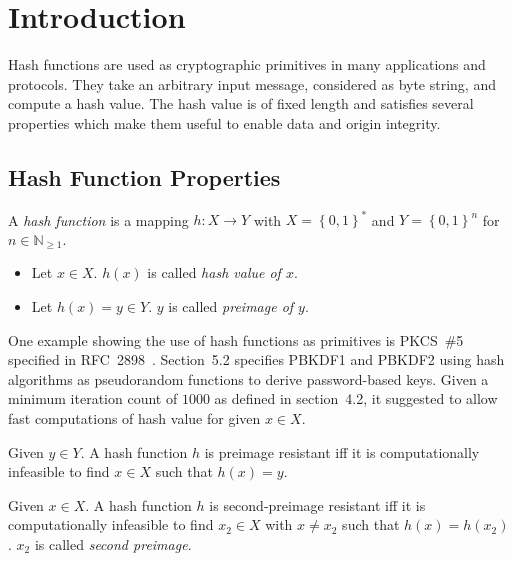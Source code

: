 \chapter{Introduction}
\label{ch:introduction}
%
Hash functions are used as cryptographic primitives in many applications and protocols.
They take an arbitrary input message, considered as byte string, and compute a hash value.
The hash value is of fixed length and satisfies several properties which make them useful
to enable data and origin integrity.

\section{Hash Function Properties}
\label{ch:hf-properties}
%
\begin{defi}
  A \emph{hash function} is a mapping $h: X \to Y$ with $X = \left\{0,1\right\}^*$ and
  $Y = \left\{0,1\right\}^n$ for $n \in \mathbb N_{\geq 1}$.

  \begin{itemize}\itemsep0pt
    \item Let $x \in X$. $h(x)$ is called \emph{hash value of $x$}.
    \item Let $h(x) = y \in Y$. $y$ is called \emph{preimage of $y$}.
  \end{itemize}
\end{defi}

One example showing the use of hash functions as primitives is PKCS~\#5
specified in RFC~2898~\cite{rfc2898}. Section~5.2 specifies PBKDF1 and PBKDF2 using
hash algorithms as pseudorandom functions to derive password-based keys.
Given a minimum iteration count of $1000$ as defined in section~4.2,
it suggested to allow fast computations of hash value for given $x \in X$.

\begin{defi}
  Given $y \in Y$.
  A hash function $h$ is preimage resistant iff it is computationally infeasible
  to find $x \in X$ such that $h(x) = y$.
\end{defi}

\begin{defi}
  Given $x \in X$.
  A hash function $h$ is second-preimage resistant iff it is computationally infeasible
  to find $x_2 \in X$ with $x \neq x_2$ such that $h(x) = h(x_2)$.
  $x_2$ is called \emph{second preimage}.
\end{defi}

